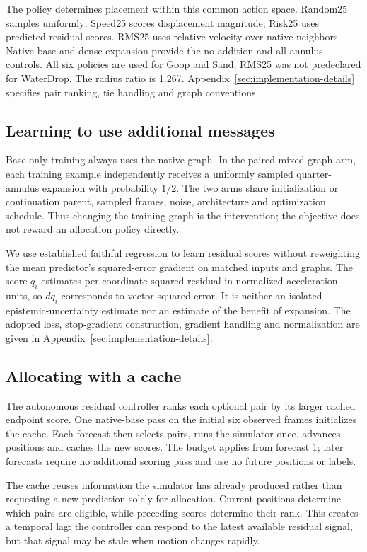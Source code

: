 The policy determines placement within this common action space. Random25 samples uniformly; Speed25 scores displacement magnitude; Risk25 uses predicted residual scores. RMS25 uses relative velocity over native neighbors. Native base and dense expansion provide the no-addition and all-annulus controls. All six policies are used for Goop and Sand; RMS25 was not predeclared for WaterDrop. The radius ratio is 1.267. Appendix~\ref{sec:implementation-details} specifies pair ranking, tie handling and graph conventions.

\subsection{Learning to use additional messages}
Base-only training always uses the native graph. In the paired mixed-graph arm, each training example independently receives a uniformly sampled quarter-annulus expansion with probability $1/2$. The two arms share initialization or continuation parent, sampled frames, noise, architecture and optimization schedule. Thus changing the training graph is the intervention; the objective does not reward an allocation policy directly.

We use established faithful regression\citep{stirn2023} to learn residual scores without reweighting the mean predictor's squared-error gradient on matched inputs and graphs. The score $q_i$ estimates per-coordinate squared residual in normalized acceleration units, so $dq_i$ corresponds to vector squared error. It is neither an isolated epistemic-uncertainty estimate nor an estimate of the benefit of expansion. The adopted loss, stop-gradient construction, gradient handling and normalization are given in Appendix~\ref{sec:implementation-details}.

\subsection{Allocating with a cache}
The autonomous residual controller ranks each optional pair by its larger cached endpoint score. One native-base pass on the initial six observed frames initializes the cache. Each forecast then selects pairs, runs the simulator once, advances positions and caches the new scores. The budget applies from forecast 1; later forecasts require no additional scoring pass and use no future positions or labels.

The cache reuses information the simulator has already produced rather than requesting a new prediction solely for allocation. Current positions determine which pairs are eligible, while preceding scores determine their rank. This creates a temporal lag: the controller can respond to the latest available residual signal, but that signal may be stale when motion changes rapidly.

